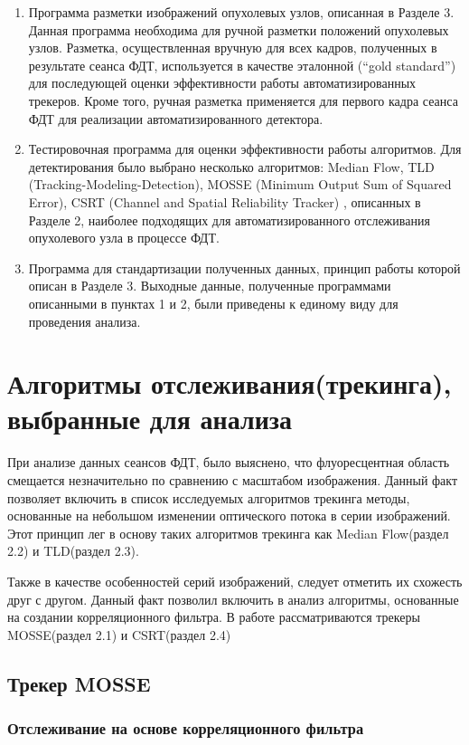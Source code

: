 \documentclass[a4paper,14pt]{extarticle}
\begin{document}
\begin{enumerate}
    \item Программа разметки изображений опухолевых узлов, описанная в Разделе 3. Данная программа необходима для ручной разметки положений опухолевых узлов. Разметка, осуществленная вручную для всех кадров, полученных в результате сеанса ФДТ, используется в качестве эталонной (“gold standard”) для последующей оценки эффективности работы автоматизированных трекеров. Кроме того, ручная разметка применяется для первого кадра сеанса ФДТ для реализации автоматизированного детектора. 
    \item Тестировочная программа для оценки эффективности работы алгоритмов. Для детектирования было выбрано несколько алгоритмов: Median Flow, TLD (Tracking-Modeling-Detection), MOSSE (Minimum Output Sum of Squared Error), CSRT (Channel and Spatial Reliability Tracker) , описанных в Разделе 2, наиболее подходящих для автоматизированного отслеживания опухолевого узла в процессе ФДТ.
    \item Программа для стандартизации полученных данных, принцип работы которой описан в Разделе 3. Выходные данные, полученные программами описанными в пунктах 1 и 2, были приведены к единому виду для проведения анализа. 
\end{enumerate}

\newpage 
\section{Алгоритмы отслеживания(трекинга), выбранные для анализа}

При анализе данных сеансов ФДТ, было выяснено, что флуоресцентная область смещается незначительно по сравнению с масштабом изображения. Данный факт позволяет включить в список исследуемых  алгоритмов трекинга методы, основанные на небольшом изменении оптического потока в серии изображений. Этот принцип лег в основу таких алгоритмов трекинга как Median Flow(раздел 2.2) и TLD(раздел 2.3).

Также в качестве особенностей серий изображений, следует отметить их схожесть друг с другом. Данный факт позволил включить в анализ алгоритмы, основанные на создании корреляционного фильтра. В работе рассматриваются трекеры MOSSE(раздел 2.1) и CSRT(раздел 2.4)     

\subsection{Трекер MOSSE}
\subsubsection{Отслеживание на основе корреляционного фильтра}
\end{document}
